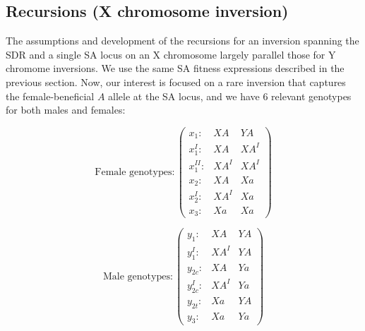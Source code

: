 \documentclass[11pt]{article}
\begin{document}
\subsection{Recursions (X chromosome inversion)}

The assumptions and development of the recursions for an inversion spanning the SDR and a single SA locus on an X chromosome largely parallel those for Y chromome inversions. We use the same SA fitness expressions described in the previous section. Now, our interest is focused on a rare inversion that captures the female-beneficial $A$ allele at the SA locus, and we have $6$ relevant genotypes for both males and females:

\begin{equation*}
	\text{Female genotypes}:\left( \begin{array}{cc|c}
		x_1:        & XA   & YA \\
		x^I_{1}:    & XA   & XA^I \\
		x^{II}_{1}: & XA^I & XA^I \\
		x_{2}:      & XA   & Xa \\
		x^I_{2}:    & XA^I & Xa \\
		x_{3}:      & Xa   & Xa 
	\end{array} \right)
\end{equation*}

\begin{equation*}
	\text{Male genotypes}:\left( \begin{array}{cc|c}
		y_1:      & XA   & YA \\
		y^I_{1}:  & XA^I & YA \\
		y_{2c}:   & XA   & Ya \\
		y^I_{2c}: & XA^I & Ya \\
		y_{2t}:   & Xa & YA \\
		y_{3}:    & Xa & Ya 
	\end{array} \right)
\end{equation*}
\end{document}
